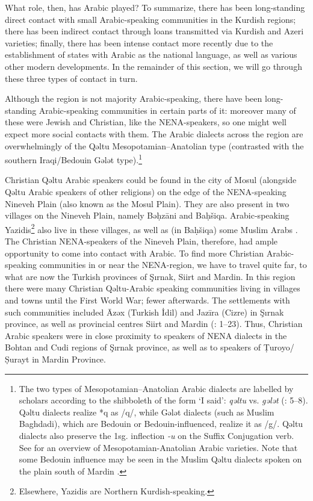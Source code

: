 \documentclass[output=paper]{langsci/langscibook}
\begin{document}
What role, then, has Arabic played? To summarize, there has been long-standing direct contact with small Arabic-speaking communities in the Kurdish regions; there has been indirect contact through loans transmitted via Kurdish and Azeri varieties; finally, there has been intense contact more recently due to the establishment of states with Arabic as the national language, as well as various other modern developments. In the remainder of this section, we will go through these three types of contact in turn.

Although the region is not majority Arabic-speaking, there have been long-standing Arabic-speaking communities in certain parts of it: moreover many of these were Jewish and Christian, like the NENA-speakers, so one might well expect more social contacts with them. The Arabic dialects across the region are overwhelmingly of the Qəltu Mesopotamian–Anatolian type (contrasted with the southern Iraqi/Bedouin Gələt type).\footnote{The two types of Mesopotamian–Anatolian Arabic dialects are labelled by scholars according to the shibboleth of the form ‘I said’: \textit{qəltu} vs. \textit{gələt} (\citealt{Blanc1964}: 5–8). Qəltu dialects realize *q as /q/, while Gələt dialects (such as Muslim Baghdadi), which are Bedouin or Bedouin-influenced, realize it as /g/. Qəltu dialects also preserve the 1sg. inflection \textit{{}-u} on the Suffix Conjugation verb. See \citet{Talay2011} for an overview of Mesopotamian-Anatolian Arabic varieties. Note that some Bedouin influence may be seen in the Muslim Qəltu dialects spoken on the plain south of Mardin \citep[30]{Jastrow1978}.}

Christian Qəltu Arabic speakers could be found in the city of Mosul (alongside Qəltu Arabic speakers of other religions) on the edge of the NENA-speaking Nineveh Plain (also known as the Mosul Plain). They are also present in two villages on the Nineveh Plain, namely Bəḥzāni and Baḥšiqa. Arabic-speaking Yazidis\footnote{Elsewhere, Yazidis are Northern Kurdish-speaking.} also live in these villages, as well as (in Baḥšiqa) some Muslim Arabs \citep[24]{Jastrow1978}. The Christian NENA-speakers of the Nineveh Plain, therefore, had ample opportunity to come into contact with Arabic. To find more Christian Arabic-speaking communities in or near the NENA-region, we have to travel quite far, to what are now the Turkish provinces of Şırnak, Siirt and Mardin. In this region there were many Christian Qəltu-Arabic speaking communities living in villages and towns until the First World War; fewer afterwards. The settlements with such communities included Āzəx (Turkish İdil) and Jazīra (Cizre) in Şırnak province, as well as provincial centres Siirt and Mardin (\citealt{Jastrow1978}: 1–23). Thus, Christian Arabic speakers were in close proximity to speakers of NENA dialects in the Bohtan and Cudi regions of Şırnak province, as well as to speakers of Ṭuroyo/Ṣurayt in Mardin Province.
\end{document}
